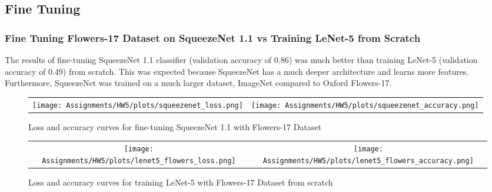 \documentclass[a4paper]{article}
\begin{document}
\subsection{Fine Tuning}
\subsubsection{Fine Tuning Flowers-17 Dataset on SqueezeNet 1.1 vs Training LeNet-5 from Scratch}

The results of fine-tuning SqueezeNet 1.1 classifier (validation accuracy of 0.86) was much better than training LeNet-5 (validation accuracy of 0.49) from scratch. This was expected because SqueezeNet has a much deeper architecture and learns more features. Furthermore, SqueezeNet was trained on a much larger dataset, ImageNet compared to Oxford Flowers-17.

\begin{figure}[!ht]
\centering
\begin{tabular}{cc}
{\texttt{[image: Assignments/HW5/plots/squeezenet\_loss.png]}} &
{\texttt{[image: Assignments/HW5/plots/squeezenet\_accuracy.png]}}
\end{tabular}
\caption{Loss and accuracy curves for fine-tuning SqueezeNet 1.1 with Flowers-17 Dataset}
\end{figure}

\begin{figure}[!ht]
\centering
\begin{tabular}{cc}
{\texttt{[image: Assignments/HW5/plots/lenet5\_flowers\_loss.png]}} &
{\texttt{[image: Assignments/HW5/plots/lenet5\_flowers\_accuracy.png]}}
\end{tabular}
\caption{Loss and accuracy curves for training LeNet-5 with Flowers-17 Dataset from scratch}
\end{figure}
\end{document}
